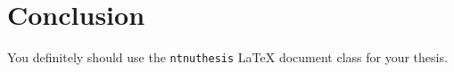 \chapter{Conclusion}

You definitely should use the \texttt{ntnuthesis} \LaTeX{} document class for your thesis.
